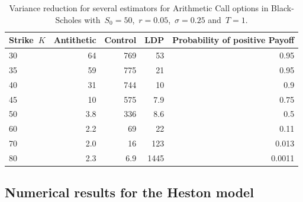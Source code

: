 \begin{table}[H]
\centering
\begin{tabular}{lrrrr}
\toprule
 Strike~$K$ &  Antithetic &  Control &  LDP &  Probability of positive Payoff \\
\midrule
     30 &          64 &      769 &   53 &                            0.95 \\
     35 &          59 &      775 &   21 &                            0.95 \\
     40 &          31 &      744 &   10 &                             0.9 \\
     45 &          10 &      575 &  7.9 &                            0.75 \\
     50 &         3.8 &      336 &  8.6 &                             0.5 \\
     60 &         2.2 &       69 &   22 &                            0.11 \\
     70 &         2.0 &       16 &  123 &                           0.013 \\
     80 &         2.3 &      6.9 & 1445 &                          0.0011 \\
\bottomrule
\end{tabular}
\caption{Variance reduction for several estimators for Arithmetic Call options in Black-Scholes with~$S_0=50$,~$r=0.05$,~$\sigma = 0.25$ and~$T=1$.}\label{table:BSCompare}
\end{table}
\subsection{Numerical results for the Heston model}
